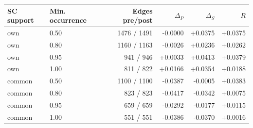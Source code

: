 \begin{tabular}{llrrrr}
\toprule
SC support & Min. occurrence & Edges pre/post & $\Delta_P$ & $\Delta_S$ & $R$ \\
\midrule
own & 0.50 & 1476 / 1491 & -0.0000 & +0.0375 & +0.0375 \\
own & 0.80 & 1160 / 1163 & -0.0026 & +0.0236 & +0.0262 \\
own & 0.95 & 941 / 946 & +0.0033 & +0.0413 & +0.0379 \\
own & 1.00 & 811 / 822 & +0.0166 & +0.0354 & +0.0188 \\
common & 0.50 & 1100 / 1100 & -0.0387 & -0.0005 & +0.0383 \\
common & 0.80 & 823 / 823 & -0.0417 & -0.0342 & +0.0075 \\
common & 0.95 & 659 / 659 & -0.0292 & -0.0177 & +0.0115 \\
common & 1.00 & 551 / 551 & -0.0386 & -0.0370 & +0.0016 \\
\bottomrule
\end{tabular}

